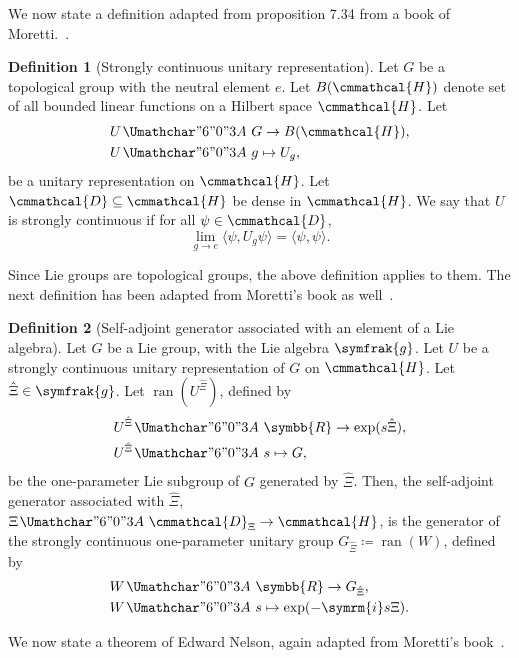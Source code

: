 \documentclass[12pt, a4 paper]{article}
\renewcommand{\symcal}{\cmmathcal}
\theoremstyle{definition}
\newtheorem{defn}{Definition}
\newcommand*{\mitsansXi}{\char"E04E}
\renewcommand{\mitsansXi}{\hat{\Xi}}
\newcommand{\rr}{\symbb{R}}
\newcommand{\hilbert}{\symcal{H}}
\renewcommand{\i}{\symrm{i}}
\newcommand{\domain}{\symcal{D}}
\renewcommand{\colon}{\nobreak\mskip2mu\mathpunct{}\nonscript
  \mkern-\thinmuskip{\Umathchar"6 "0 "3A}\mskip6muplus1mu\relax}
\begin{document}
    We now state a definition adapted from proposition 7.34 from a book of Moretti.~\cite[p.~287]{MorettiFundamental}.
    \begin{defn}[Strongly continuous unitary representation]
        Let \(G\) be a topological group with the neutral element \(e\). Let \(B(\hilbert)\) denote set of all bounded linear functions on a Hilbert space \(\hilbert\). Let
        \begin{align*}
            U &\colon G \rightarrow B(\hilbert),\\
            U &\colon g \mapsto U_g,
        \end{align*}
        be a unitary representation on \(\hilbert\). Let \(\domain \subseteq \hilbert\) be dense in \(\hilbert\). We say that \(U\) is strongly continuous if for all \(\psi \in \domain\),
        \[
            \lim_{g \rightarrow e} \langle\psi, U_g\psi\rangle = \langle\psi, \psi\rangle.
        \]
    \end{defn}
    Since Lie groups are topological groups, the above definition applies to them. The next definition has been adapted from Moretti's book as well~\cite[p.~288]{MorettiFundamental}.
    \begin{defn}[Self-adjoint generator associated with an element of a Lie algebra]
        Let \(G\) be a Lie group, with the Lie algebra \(\symfrak{g}\). Let \(U\) be a strongly continuous unitary representation of \(G\) on \(\hilbert\). Let \(\mitsansXi \in \symfrak{g}\). Let \(\operatorname{ran}(U^{\mitsansXi})\), defined by
        \begin{align*}
            U^{\mitsansXi} &\colon \rr \rightarrow \exp(s\mitsansXi),\\
            U^{\mitsansXi} &\colon s \mapsto G,
        \end{align*}
        be the one-parameter Lie subgroup of \(G\) generated by \(\mitsansXi\). Then, the self-adjoint generator associated with \(\mitsansXi\), \(\Xi \colon \domain_{\Xi} \rightarrow \hilbert\), is the generator of the strongly continuous one-parameter unitary group \(G_{\mitsansXi} \coloneq \operatorname{ran}(W)\), defined by
        \begin{align*}
            W &\colon \rr \rightarrow G_{\mitsansXi},\\
            W &\colon s \mapsto \exp(-\i s \Xi).
        \end{align*}
    \end{defn}
    We now state a theorem of Edward Nelson, again adapted from Moretti's book~\cite[p.~291]{MorettiFundamental}.
\end{document}
